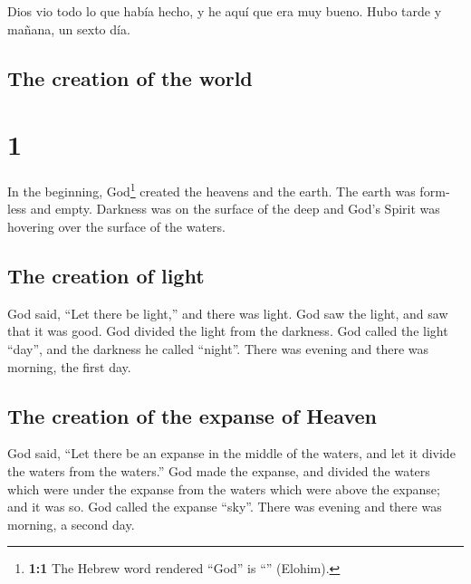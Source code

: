 \begin{paracol}{2}
 Dios vio todo lo que había hecho, y he aquí que era muy
bueno. Hubo tarde y mañana, un sexto día.

\switchcolumn
\begin{otherlanguage}{english}

\hypertarget{the-creation-of-the-world}{%
\subsection{The creation of the world}\label{the-creation-of-the-world}}

\hypertarget{section-1}{%
\section{1}\label{section-1}}

 In the beginning, God\footnote{\textbf{1:1} The Hebrew
  word rendered ``God'' is ``'' (Elohim).} created the
heavens and the earth.  The earth was formless and empty.
Darkness was on the surface of the deep and God's Spirit was hovering
over the surface of the waters.

\hypertarget{the-creation-of-light}{%
\subsection{The creation of light}\label{the-creation-of-light}}

 God said, ``Let there be light,'' and there was light.
 God saw the light, and saw that it was good. God divided
the light from the darkness.  God called the light
``day'', and the darkness he called ``night''. There was evening and
there was morning, the first day.

\hypertarget{the-creation-of-the-expanse-of-heaven}{%
\subsection{The creation of the expanse of
Heaven}\label{the-creation-of-the-expanse-of-heaven}}

 God said, ``Let there be an expanse in the middle of the
waters, and let it divide the waters from the waters.'' 
God made the expanse, and divided the waters which were under the
expanse from the waters which were above the expanse; and it was so.
 God called the expanse ``sky''. There was evening and
there was morning, a second day.


\end{otherlanguage}
\end{paracol}
